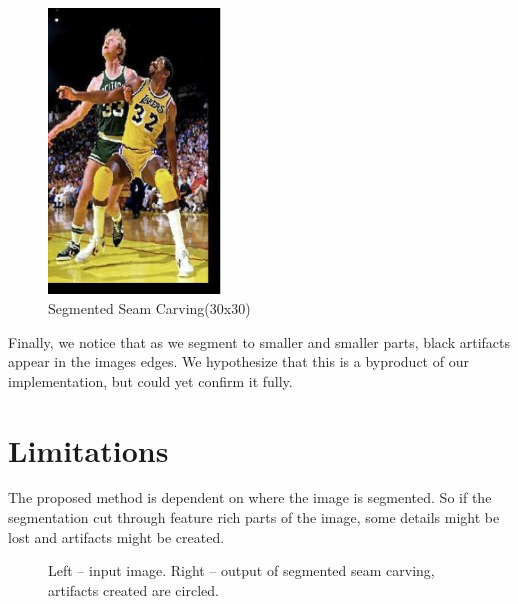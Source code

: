 \documentclass[conference]{acmsiggraph}
\begin{document}
\begin{figure}[ht]
  \centering
  \includegraphics[width=1.8in]{images/bird_32by32}
  \caption{ Segmented Seam Carving(30x30)
  }
  \label{fig:bird3232}
\end{figure}


Finally, we notice that as we segment to smaller and smaller parts, black artifacts appear in the images edges. We hypothesize that this is a byproduct of our implementation, but could yet confirm it fully.


\section{Limitations}

The proposed method is dependent on where the image is segmented. So if the segmentation cut through feature rich parts of the image, some details might be lost and artifacts might be created. 

\begin{figure}[ht]       
    \caption{Left -- input image. Right -- output of segmented seam carving, artifacts created are circled.}
    \label{fig:Beach_in_and_out}
    
\end{figure}
\end{document}
